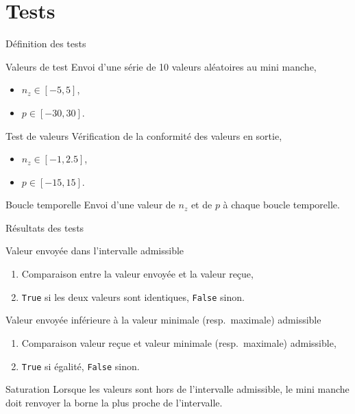 \documentclass[footheight=2em]{beamer}
\begin{document}
\section{Tests}
\begin{frame}[t]{Définition des tests}
  \begin{block}{Valeurs de test}
    Envoi d'une série de 10 valeurs aléatoires au mini manche,
    \begin{itemize}
      \item \(n_z \in [-5, 5]\),
      \item \(p \in [-30, 30]\).
    \end{itemize}
  \end{block}
  \begin{block}{Test de valeurs}
    Vérification de la conformité des valeurs en sortie,
    \begin{itemize}
      \item \(n_z \in [-1, 2.5]\),
      \item \(p \in [-15, 15]\).
    \end{itemize}
  \end{block}
  \begin{block}{Boucle temporelle}
    Envoi d'une valeur de \(n_z\) et de \(p\) à chaque boucle temporelle.
  \end{block}
\end{frame}

\begin{frame}[t]{Résultats des tests}
  \begin{block}{Valeur envoyée dans l'intervalle admissible}
    \begin{enumerate}
      \item Comparaison entre la valeur envoyée et la valeur reçue,
      \item \texttt{True} si les deux valeurs sont identiques, \texttt{False}
        sinon.
    \end{enumerate}
  \end{block}
  \pause
  \begin{block}{Valeur envoyée inférieure à la valeur minimale (resp.\
      maximale) admissible}
    \begin{enumerate}
      \item Comparaison valeur reçue et valeur minimale (resp.\ maximale)
        admissible,
      \item \texttt{True} si égalité, \texttt{False} sinon.
    \end{enumerate}
  \end{block}
  \pause
  \begin{block}{Saturation}
    Lorsque les valeurs sont hors de l'intervalle admissible, le mini manche doit
    renvoyer la borne la plus proche de l'intervalle.
  \end{block}
\end{frame}
\end{document}
